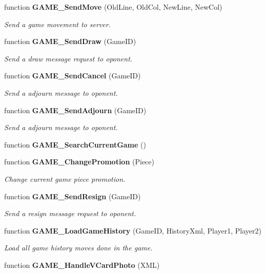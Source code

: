 \begin{CompactItemize}
function {\bf GAME\_\-SendMove} (OldLine, OldCol, NewLine, NewCol)
\begin{CompactList}\small\item\em Send a game movement to server. \item\end{CompactList}\item 
function {\bf GAME\_\-SendDraw} (GameID)
\begin{CompactList}\small\item\em Send a draw message request to oponent. \item\end{CompactList}\item 
function {\bf GAME\_\-SendCancel} (GameID)
\begin{CompactList}\small\item\em Send a adjourn message to oponent. \item\end{CompactList}\item 
function {\bf GAME\_\-SendAdjourn} (GameID)
\begin{CompactList}\small\item\em Send a adjourn message to oponent. \item\end{CompactList}\item 
function {\bf GAME\_\-SearchCurrentGame} ()
\item 
function {\bf GAME\_\-ChangePromotion} (Piece)
\begin{CompactList}\small\item\em Change current game piece promotion. \item\end{CompactList}\item 
function {\bf GAME\_\-SendResign} (GameID)
\begin{CompactList}\small\item\em Send a resign message request to oponent. \item\end{CompactList}\item 
function {\bf GAME\_\-LoadGameHistory} (GameID, HistoryXml, Player1, Player2)
\begin{CompactList}\small\item\em Load all game history moves done in the game. \item\end{CompactList}\item 
function {\bf GAME\_\-HandleVCardPhoto} (XML)

\end{CompactItemize}
